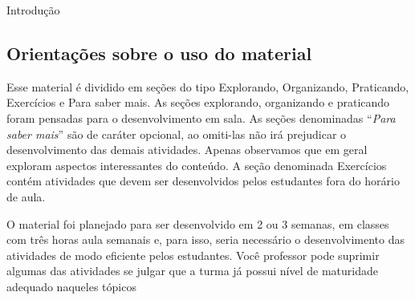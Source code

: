 \begin{apresentacao}{Introdução}
\subsection *{Orientações sobre o uso do material}

Esse material é dividido em seções do tipo Explorando, Organizando, Praticando, Exercícios e Para saber mais. As seções explorando, organizando e praticando foram pensadas para o desenvolvimento em sala. As seções denominadas “\textit{Para saber mais}” são de caráter opcional, ao omiti-las não irá prejudicar o desenvolvimento das demais atividades. Apenas observamos que em geral  exploram aspectos interessantes do conteúdo. A seção denominada Exercícios contém atividades que devem ser desenvolvidos pelos estudantes fora do horário de aula. 

O material foi planejado para ser desenvolvido em 2 ou 3 semanas, em classes com três horas aula semanais e, para isso, seria necessário o desenvolvimento das atividades de modo eficiente pelos estudantes. Você  professor pode suprimir  algumas das atividades se julgar que a turma já possui nível de maturidade adequado naqueles tópicos


\end{apresentacao}

